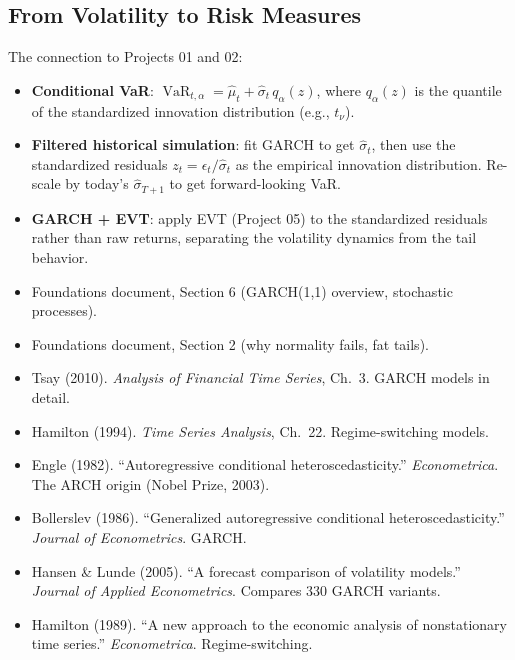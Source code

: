 \documentclass[11pt, a4paper]{article}
\newcommand{\VaR}{\operatorname{VaR}}
\begin{document}
\subsection{From Volatility to Risk Measures}

The connection to Projects 01 and 02:
\begin{itemize}
    \item \textbf{Conditional VaR}: $\VaR_{t,\alpha} = \hat\mu_t + \hat\sigma_t \, q_\alpha(z)$, where $q_\alpha(z)$ is the quantile of the standardized innovation distribution (e.g., $t_\nu$).
    \item \textbf{Filtered historical simulation}: fit GARCH to get $\hat\sigma_t$, then use the standardized residuals $z_t = \epsilon_t / \hat\sigma_t$ as the empirical innovation distribution. Re-scale by today's $\hat\sigma_{T+1}$ to get forward-looking VaR.
    \item \textbf{GARCH + EVT}: apply EVT (Project 05) to the standardized residuals rather than raw returns, separating the volatility dynamics from the tail behavior.
\end{itemize}

\begin{prereq}
\begin{itemize}
    \item Foundations document, Section 6 (GARCH(1,1) overview, stochastic processes).
    \item Foundations document, Section 2 (why normality fails, fat tails).
    \item Tsay (2010). \emph{Analysis of Financial Time Series}, Ch.~3. GARCH models in detail.
    \item Hamilton (1994). \emph{Time Series Analysis}, Ch.~22. Regime-switching models.
\end{itemize}
\end{prereq}

\begin{refbox}
\begin{itemize}
    \item Engle (1982). ``Autoregressive conditional heteroscedasticity.'' \emph{Econometrica}. The ARCH origin (Nobel Prize, 2003).
    \item Bollerslev (1986). ``Generalized autoregressive conditional heteroscedasticity.'' \emph{Journal of Econometrics}. GARCH.
    \item Hansen \& Lunde (2005). ``A forecast comparison of volatility models.'' \emph{Journal of Applied Econometrics}. Compares 330 GARCH variants.
    \item Hamilton (1989). ``A new approach to the economic analysis of nonstationary time series.'' \emph{Econometrica}. Regime-switching.
\end{itemize}
\end{refbox}
\end{document}
